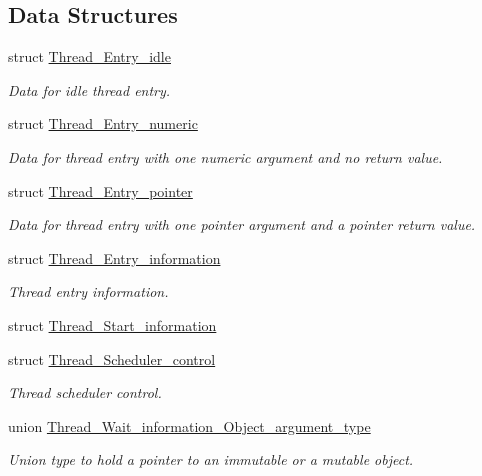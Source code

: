 \subsection*{Data Structures}
\begin{DoxyCompactItemize}
\item 
struct \mbox{\hyperlink{structThread__Entry__idle}{Thread\+\_\+\+Entry\+\_\+idle}}
\begin{DoxyCompactList}\small\item\em Data for idle thread entry. \end{DoxyCompactList}\item 
struct \mbox{\hyperlink{structThread__Entry__numeric}{Thread\+\_\+\+Entry\+\_\+numeric}}
\begin{DoxyCompactList}\small\item\em Data for thread entry with one numeric argument and no return value. \end{DoxyCompactList}\item 
struct \mbox{\hyperlink{structThread__Entry__pointer}{Thread\+\_\+\+Entry\+\_\+pointer}}
\begin{DoxyCompactList}\small\item\em Data for thread entry with one pointer argument and a pointer return value. \end{DoxyCompactList}\item 
struct \mbox{\hyperlink{structThread__Entry__information}{Thread\+\_\+\+Entry\+\_\+information}}
\begin{DoxyCompactList}\small\item\em Thread entry information. \end{DoxyCompactList}\item 
struct \mbox{\hyperlink{structThread__Start__information}{Thread\+\_\+\+Start\+\_\+information}}
\item 
struct \mbox{\hyperlink{structThread__Scheduler__control}{Thread\+\_\+\+Scheduler\+\_\+control}}
\begin{DoxyCompactList}\small\item\em Thread scheduler control. \end{DoxyCompactList}\item 
union \mbox{\hyperlink{unionThread__Wait__information__Object__argument__type}{Thread\+\_\+\+Wait\+\_\+information\+\_\+\+Object\+\_\+argument\+\_\+type}}
\begin{DoxyCompactList}\small\item\em Union type to hold a pointer to an immutable or a mutable object. \end{DoxyCompactList}\item 

\end{DoxyCompactItemize}
